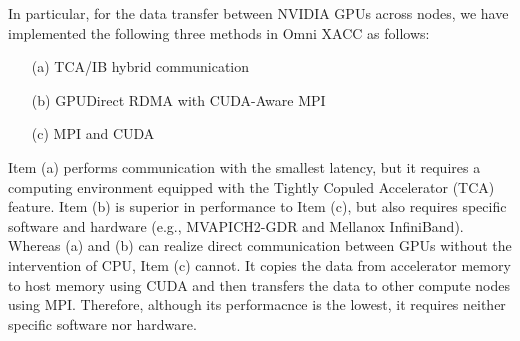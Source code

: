 In particular, for the data transfer between NVIDIA GPUs across
nodes, we have implemented the following three methods in Omni XACC as
follows:

\begin{enumerate}
  \item[(a)] TCA/IB hybrid communication
  \item[(b)] GPUDirect RDMA with CUDA-Aware MPI
  \item[(c)] MPI and CUDA
\end{enumerate}

Item (a) performs communication with the smallest latency, but it
requires a computing environment equipped with the Tightly Copuled
Accelerator (TCA) feature\cite{tca,tca2}.
%
Item (b) is superior in performance to Item (c), but also
requires specific software and hardware (e.g., MVAPICH2-GDR and Mellanox
InfiniBand).
%
Whereas (a) and (b) can realize direct communication between GPUs
without the intervention of CPU, 
%
Item (c) cannot. It copies the data from accelerator memory to 
host memory using CUDA and then transfers the data to other compute
nodes using MPI.
Therefore, although its performacnce is the lowest, it requires neither
specific software nor hardware.
